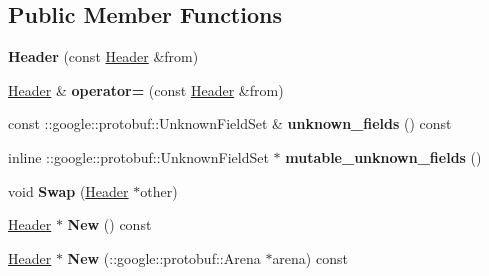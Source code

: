 \subsection*{Public Member Functions}
\begin{DoxyCompactItemize}
\item 
\hypertarget{classstruct_definitions_1_1_header_ace0d0c255c0769c0f8a05ea478427c6b}{}\label{classstruct_definitions_1_1_header_ace0d0c255c0769c0f8a05ea478427c6b} 
{\bfseries Header} (const \hyperlink{classstruct_definitions_1_1_header}{Header} \&from)
\item 
\hypertarget{classstruct_definitions_1_1_header_a54d1fafea426fa2cc03ab4f8f2093c71}{}\label{classstruct_definitions_1_1_header_a54d1fafea426fa2cc03ab4f8f2093c71} 
\hyperlink{classstruct_definitions_1_1_header}{Header} \& {\bfseries operator=} (const \hyperlink{classstruct_definitions_1_1_header}{Header} \&from)
\item 
\hypertarget{classstruct_definitions_1_1_header_ace7b9aa74f7411d4bf28e539ae381904}{}\label{classstruct_definitions_1_1_header_ace7b9aa74f7411d4bf28e539ae381904} 
const \+::google\+::protobuf\+::\+Unknown\+Field\+Set \& {\bfseries unknown\+\_\+fields} () const
\item 
\hypertarget{classstruct_definitions_1_1_header_a08e2df1221a869b62a98ecc78fafdbfc}{}\label{classstruct_definitions_1_1_header_a08e2df1221a869b62a98ecc78fafdbfc} 
inline \+::google\+::protobuf\+::\+Unknown\+Field\+Set $\ast$ {\bfseries mutable\+\_\+unknown\+\_\+fields} ()
\item 
\hypertarget{classstruct_definitions_1_1_header_ab2135cd653be3f4b98a5a8e0d46842b8}{}\label{classstruct_definitions_1_1_header_ab2135cd653be3f4b98a5a8e0d46842b8} 
void {\bfseries Swap} (\hyperlink{classstruct_definitions_1_1_header}{Header} $\ast$other)
\item 
\hypertarget{classstruct_definitions_1_1_header_aa2a35a251bc8c6980ca82838654c6a81}{}\label{classstruct_definitions_1_1_header_aa2a35a251bc8c6980ca82838654c6a81} 
\hyperlink{classstruct_definitions_1_1_header}{Header} $\ast$ {\bfseries New} () const
\item 
\hypertarget{classstruct_definitions_1_1_header_ae8b1e9141577a50014891dbb0188184d}{}\label{classstruct_definitions_1_1_header_ae8b1e9141577a50014891dbb0188184d} 
\hyperlink{classstruct_definitions_1_1_header}{Header} $\ast$ {\bfseries New} (\+::google\+::protobuf\+::\+Arena $\ast$arena) const
\item 
\hypertarget{classstruct_definitions_1_1_header_ac00c146297cfb4e2d51e147a6f0e6008}{}\label{classstruct_definitions_1_1_header_ac00c146297cfb4e2d51e147a6f0e6008} 

\end{DoxyCompactItemize}
